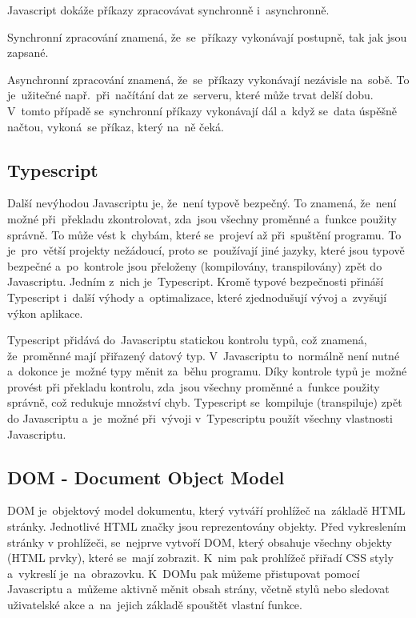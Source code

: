\documentclass[14pt,a4paper]{article}
\begin{document}
        Javascript dokáže příkazy zpracovávat synchronně i~asynchronně.
        
        Synchronní zpracování znamená, že~se~příkazy vykonávají postupně, tak jak
        jsou zapsané.
        
        Asynchronní zpracování znamená, že~se~příkazy vykonávají nezávisle na~sobě. To je~užitečné např.~při~načítání dat ze~serveru,
        které může trvat delší dobu. V~tomto případě se~synchronní příkazy vykonávají dál a~když se~data úspěšně načtou, vykoná~se příkaz, který na~ně čeká. \parencite{kantor_javascript}

        \subsection{Typescript}
        Další nevýhodou Javascriptu je, že~není typově bezpečný. To znamená, že~není možné při~překladu zkontrolovat, zda~jsou všechny proměnné
        a~funkce použity správně. To může vést k~chybám, které se~projeví až při~spuštění programu. To je~pro~větší projekty nežádoucí, proto se~používají
        jiné jazyky, které jsou typově bezpečné a~po~kontrole jsou přeloženy (kompilovány, transpilovány) zpět do Javascriptu. Jedním z~nich je~Typescript.
        Kromě typové bezpečnosti přináší Typescript i~další výhody a~optimalizace, které zjednodušují vývoj a~zvyšují výkon aplikace.

        Typescript přidává do~Javascriptu statickou kontrolu typů, což znamená, že~proměnné mají přiřazený datový typ. V~Javascriptu to~normálně není nutné a~dokonce je~možné typy měnit za~běhu programu.
        Díky kontrole typů je~možné provést při překladu kontrolu, zda~jsou všechny proměnné a~funkce použity správně, což redukuje množství chyb.
        Typescript se~kompiluje (transpiluje) zpět do Javascriptu a~je~možné při~vývoji v~Typescriptu použít všechny vlastnosti Javascriptu.\parencite[Get started/TypeScript for the New Programmer]{TypeScript}

        \subsection{DOM - Document Object Model}
        DOM je~objektový model dokumentu, který vytváří prohlížeč na~základě HTML stránky. Jednotlivé HTML značky jsou reprezentovány objekty.
        Před vykreslením stránky v prohlížeči, se~nejprve vytvoří DOM, který obsahuje všechny objekty (HTML prvky), které se~mají zobrazit.
        K~nim pak prohlížeč přiřadí CSS styly a~vykreslí je~na~obrazovku. K~DOMu pak můžeme přistupovat pomocí Javascriptu
        a~můžeme aktivně měnit obsah strány, včetně stylů nebo sledovat uživatelské akce a~na~jejich základě spouštět vlastní funkce.\parencite[2.1.01]{kantor_javascript}
        
\end{document}
